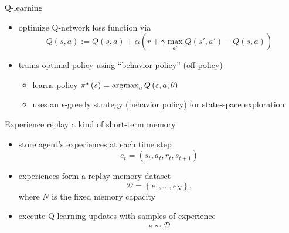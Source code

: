\begin{frame}{Q-learning}
    \begin{itemize}\itemsep=12pt

        \item optimize Q-network loss function via
        \[
            Q\left(s,a\right) :=
            Q\left(s,a\right) +
            \alpha \left( r + \gamma\max_{a'}Q\left(s',a'\right) - Q\left(s,a\right) \right)
        \]
        
        \item trains optimal policy using ``behavior policy'' (off-policy)
        \vspace*{0.5em}
        \begin{itemize}
            \item learns policy $\pi^{\star}\left(s\right) = \mathop{\rm argmax}_{a}Q\left(s,a;\theta\right)$
            \item uses an $\epsilon$-greedy strategy (behavior policy) for state-space exploration
        \end{itemize}
    
    \end{itemize}
\end{frame}

\begin{frame}{Experience replay}
    a kind of short-term memory
    \vspace*{0.5em}
    \begin{itemize}\itemsep=12pt

        \item store agent's experiences at each time step
        \[
            e_{t} = \left(s_{t},a_{t},r_{t},s_{t+1}\right)
        \]
        
        \item experiences form a replay memory dataset
        \[
            \mathcal{D} = \left\{ e_{1}, \ldots, e_{N} \right\},
        \]
        where $N$ is the fixed memory capacity

        \item execute Q-learning updates with samples of experience
        \[
            e \sim \mathcal{D}
        \]

    \end{itemize}
\end{frame}

